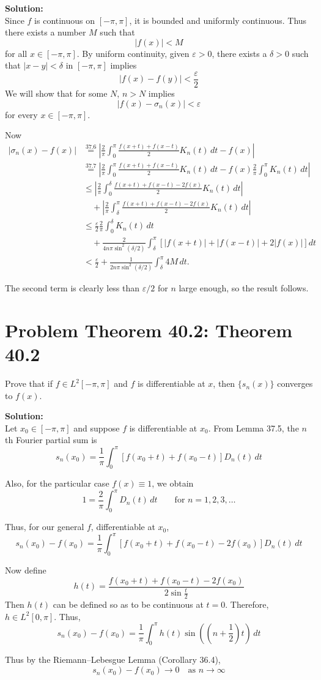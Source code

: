 \documentclass[a4paper]{article}
\let\epsilon\varepsilon
\theoremstyle{definition}
\newcounter{problem}
\newenvironment{problem}[1][]
{
    \stepcounter{problem}
    \section*{Problem \theproblem\ifx\relax#1\relax\else: #1\fi}
}
{}
\newenvironment{solution}
{
    \noindent\textbf{Solution:}\\
}
{
    
}
\begin{document}
\vspace{2em}
\begin{solution}
Since $f$ is continuous on $[-\pi,\pi]$, it is bounded and uniformly continuous.
Thus there exists a number $M$ such that
\[
    |f(x)|<M
\]
for all $x\in[-\pi,\pi]$. By uniform continuity, given $\epsilon>0$, there exists
a $\delta>0$ such that $|x-y|<\delta$ in $[-\pi,\pi]$ implies
\[
    |f(x)-f(y)|<\frac{\epsilon}{2}
\]
We will show that for some $N$, $n>N$ implies
\[
    |f(x)-\sigma_n(x)|<\epsilon
\]
for every $x\in[-\pi,\pi]$.

Now
\[
\begin{aligned}
|\sigma_n(x)-f(x)|
&\overset{37.6}{=}
\left|
\frac{2}{\pi}\int_0^\pi
\frac{f(x+t)+f(x-t)}{2}K_n(t)\,dt
-f(x)
\right| \\[6pt]
&\overset{37.7}{=}
\left|
\frac{2}{\pi}\int_0^\pi
\frac{f(x+t)+f(x-t)}{2}K_n(t)\,dt
-f(x)\frac{2}{\pi}\int_0^\pi K_n(t)\,dt
\right| \\[6pt]
&\le
\left|
\frac{2}{\pi}\int_0^\delta
\frac{f(x+t)+f(x-t)-2f(x)}{2}K_n(t)\,dt
\right| \\[6pt]
&\quad+
\left|
\frac{2}{\pi}\int_\delta^\pi
\frac{f(x+t)+f(x-t)-2f(x)}{2}K_n(t)\,dt
\right| \\[6pt]
&\le
\frac{\epsilon}{2}\frac{2}{\pi}\int_0^\delta K_n(t)\,dt \\[6pt]
&\quad+
\frac{2}{4n\pi\sin^2(\delta/2)}
\int_\delta^\pi
\left[|f(x+t)|+|f(x-t)|+2|f(x)|\right]dt \\[6pt]
&<
\frac{\epsilon}{2}
+
\frac{1}{2n\pi\sin^2(\delta/2)}
\int_\delta^\pi 4M\,dt.
\end{aligned}
\]

The second term is clearly less than $\epsilon/2$ for $n$ large enough, so the
result follows.
\end{solution}

\newpage
\begin{problem}[Theorem 40.2]
Prove that if $f\in L^2[-\pi,\pi]$ and $f$ is differentiable at $x$, then
$\{s_n(x)\}$ converges to $f(x)$.
\end{problem}

\vspace{2em}
\begin{solution}
Let $x_0\in[-\pi,\pi]$ and suppose $f$ is differentiable at $x_0$.
From Lemma 37.5, the $n$th Fourier partial sum is
\[
s_n(x_0)=\frac{1}{\pi}\int_0^\pi [f(x_0+t)+f(x_0-t)]D_n(t)\,dt
\]

Also, for the particular case $f(x)\equiv 1$, we obtain
\[
1=\frac{2}{\pi}\int_0^\pi D_n(t)\,dt
\qquad \text{for } n=1,2,3,\dots
\]

Thus, for our general $f$, differentiable at $x_0$,
\[
s_n(x_0)-f(x_0)
=
\frac{1}{\pi}\int_0^\pi
[f(x_0+t)+f(x_0-t)-2f(x_0)]D_n(t)\,dt
\]

Now define
\[
h(t)=\frac{f(x_0+t)+f(x_0-t)-2f(x_0)}{2\sin\frac{t}{2}}
\]
Then $h(t)$ can be defined so as to be continuous at $t=0$. Therefore,
$h\in L^2[0,\pi]$. Thus,
\[
s_n(x_0)-f(x_0)
=
\frac{1}{\pi}\int_0^\pi
h(t)\sin\left(\left(n+\frac12\right)t\right)\,dt
\]

Thus by the Riemann--Lebesgue Lemma (Corollary 36.4),
\[
s_n(x_0)-f(x_0)\to 0 \quad \text{as } n\to\infty
\]
\end{solution}
\end{document}
